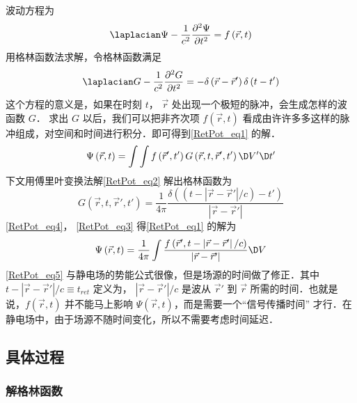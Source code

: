 
波动方程为
\begin{equation}\label{RetPot_eq1}
{\laplacian}\Psi  - \frac{1}{{{c^2}}}\frac{{{\partial ^2}\Psi }}{{\partial {t^2}}} = f\left( {\vec r,t} \right)
\end{equation} 
用格林函数法求解，令格林函数满足
\begin{equation}\label{RetPot_eq2}
{\laplacian}G - \frac{1}{{{c^2}}}\frac{{{\partial ^2}G}}{{\partial {t^2}}} =  - \delta \left( {\vec r - \vec r'} \right)\delta \left( {t - t'} \right)
\end{equation} 
这个方程的意义是，如果在时刻 $t$， $\vec r$ 处出现一个极短的脉冲，会生成怎样的波函数 $G$． 求出 $G$ 以后，我们可以把非齐次项 $f\left( {\vec r,t} \right)$ 看成由许许多多这样的脉冲组成，对空间和时间进行积分．即可得到\autoref{RetPot_eq1} 的解．
\begin{equation}\label{RetPot_eq3}
\Psi \left( {\vec r,t} \right) = \int {\int {f\left( {\vec r',t'} \right)G\left( {\vec r,t,\vec r',t'} \right)\D V'} \D t'} 
\end{equation} 
下文用傅里叶变换法解\autoref{RetPot_eq2} 解出格林函数为
\begin{equation}\label{RetPot_eq4}
G\left( {\vec r,t,\vec r',t'} \right) = \frac{1}{{4\pi }}\frac{{\delta \left( {\left( {t - \left| {\vec r - \vec r'} \right|/c} \right) - t'} \right)}}{{\left| {\vec r - \vec r'} \right|}}
\end{equation} 
\autoref{RetPot_eq4}， \autoref{RetPot_eq3} 得\autoref{RetPot_eq1} 的解为
\begin{equation}\label{RetPot_eq5}
\Psi \left( {\vec r,t} \right) = \frac{1}{{4\pi }}\int {\frac{{f\left( {\vec r',t - \left| {\vec r - \vec r'} \right|/c} \right)}}{{\left| {\vec r - \vec r'} \right|}}\D V} 
\end{equation} 
\autoref{RetPot_eq5} 与静电场的势能公式很像，但是场源的时间做了修正．其中 $t - \left| {\vec r - \vec r'} \right|/c \equiv {t_{ret}}$ 定义为， $\left| {\vec r - \vec r'} \right|/c$ 是波从 $\vec r'$ 到 $\vec r$ 所需的时间．也就是说，$f\left( {\vec r,t} \right)$ 并不能马上影响 $\Psi \left( {\vec r,t} \right)$，而是需要一个“信号传播时间” 才行．在静电场中，由于场源不随时间变化，所以不需要考虑时间延迟．

\subsection{具体过程}

\subsubsection{解格林函数}  

